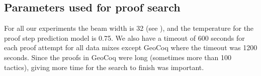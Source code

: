 \subsection{Parameters used for proof search}
\label{app:search-params}

For all our experiments the beam width is 32 (see ), and the temperature for the proof step prediction model is 0.75. We also have a timeout of 600 seconds for each proof attempt for all data mixes except GeoCoq where the timeout was 1200 seconds. Since the proofs in GeoCoq were long (sometimes more than 100 tactics), giving more time for the search to finish was important.

\begin{table}[ht]
    \centering
    \caption{Parameters used for searching for the complete proof using \proofwala\; models for guidance. We use beam search similar to GPT-$f$ \citep{polu2020generative}.}
    \label{tab:search-params}
\end{table}


